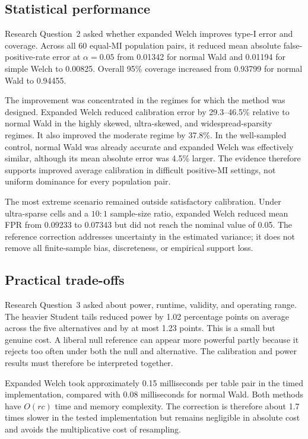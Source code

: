 \subsection{Statistical performance}

Research Question~2 asked whether expanded Welch improves type-I error and
coverage. Across all 60 equal-MI population pairs, it reduced mean absolute
false-positive-rate error at $\alpha=0.05$ from 0.01342 for normal Wald and
0.01194 for simple Welch to 0.00825. Overall 95\% coverage increased from
0.93799 for normal Wald to 0.94455.

The improvement was concentrated in the regimes for which the method was
designed. Expanded Welch reduced calibration error by 29.3--46.5\% relative
to normal Wald in the highly skewed, ultra-skewed, and widespread-sparsity
regimes. It also improved the moderate regime by 37.8\%. In the well-sampled
control, normal Wald was already accurate and expanded Welch was effectively
similar, although its mean absolute error was 4.5\% larger. The evidence
therefore supports improved average calibration in difficult positive-MI
settings, not uniform dominance for every population pair.

The most extreme scenario remained outside satisfactory calibration. Under
ultra-sparse cells and a $10:1$ sample-size ratio, expanded Welch reduced
mean FPR from 0.09233 to 0.07343 but did not reach the nominal value of 0.05.
The reference correction addresses uncertainty in the estimated variance; it
does not remove all finite-sample bias, discreteness, or empirical support
loss.

\subsection{Practical trade-offs}

Research Question~3 asked about power, runtime, validity, and operating
range. The heavier Student tails reduced power by 1.02 percentage points on
average across the five alternatives and by at most 1.23 points. This is a
small but genuine cost. A liberal null reference can appear more powerful
partly because it rejects too often under both the null and alternative. The
calibration and power results must therefore be interpreted together.

Expanded Welch took approximately 0.15 milliseconds per table pair in the
timed implementation, compared with 0.08 milliseconds for normal Wald. Both
methods have $O(rc)$ time and memory complexity. The correction is therefore
about 1.7 times slower in the tested implementation but remains negligible in
absolute cost and avoids the multiplicative cost of resampling.

